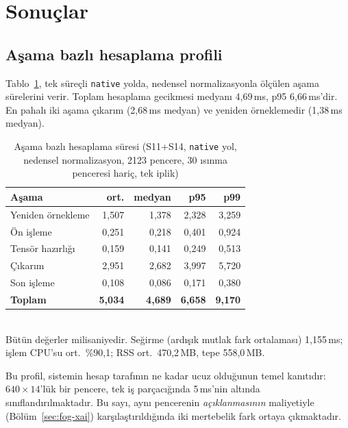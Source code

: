 \documentclass[conference]{IEEEtran}
\newcommand{\ms}{\,ms\xspace}
\begin{document}
\section{Sonuçlar}

\subsection{Aşama bazlı hesaplama profili}

Tablo~\ref{tab:asama}, tek süreçli \texttt{native} yolda, nedensel
normalizasyonla ölçülen aşama sürelerini verir. Toplam hesaplama gecikmesi
medyanı 4{,}69\ms, p95 6{,}66\ms'dir. En pahalı iki aşama çıkarım (2{,}68\ms
medyan) ve yeniden örneklemedir (1{,}38\ms medyan).

\begin{table}[t]
\caption{Aşama bazlı hesaplama süresi (S11+S14, \texttt{native} yol,
nedensel normalizasyon, 2123 pencere, 30 ısınma penceresi hariç, tek iplik)}
\label{tab:asama}
\centering
\small
\begin{tabular}{lrrrr}
\toprule
\textbf{Aşama} & \textbf{ort.} & \textbf{medyan} & \textbf{p95} & \textbf{p99}\\
\midrule
Yeniden örnekleme & 1{,}507 & 1{,}378 & 2{,}328 & 3{,}259\\
Ön işleme         & 0{,}251 & 0{,}218 & 0{,}401 & 0{,}924\\
Tensör hazırlığı  & 0{,}159 & 0{,}141 & 0{,}249 & 0{,}513\\
Çıkarım           & 2{,}951 & 2{,}682 & 3{,}997 & 5{,}720\\
Son işleme        & 0{,}108 & 0{,}086 & 0{,}171 & 0{,}380\\
\midrule
\textbf{Toplam}   & \textbf{5{,}034} & \textbf{4{,}689} & \textbf{6{,}658} & \textbf{9{,}170}\\
\bottomrule
\end{tabular}
\\[2pt]
\footnotesize Bütün değerler milisaniyedir. Seğirme (ardışık mutlak fark
ortalaması) 1{,}155\ms; işlem CPU'su ort.\ \%90{,}1; RSS ort.\ 470{,}2\,MB,
tepe 558{,}0\,MB.
\end{table}

Bu profil, sistemin hesap tarafının ne kadar ucuz olduğunun temel kanıtıdır:
$640\times14$'lük bir pencere, tek iş parçacığında 5\ms'nin altında
sınıflandırılmaktadır. Bu sayı, aynı pencerenin \emph{açıklanmasının} maliyetiyle
(Bölüm~\ref{sec:fog-xai}) karşılaştırıldığında iki mertebelik fark ortaya
çıkmaktadır.
\end{document}
